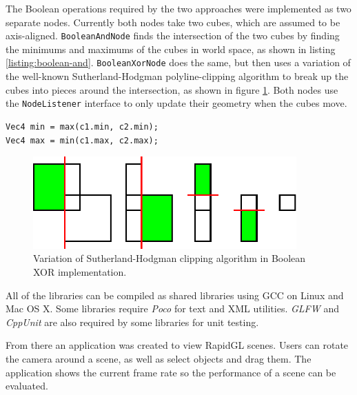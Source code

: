 \documentclass{report}
\begin{document}
The Boolean operations required by the two approaches were implemented as two
separate nodes.  Currently both nodes take two cubes, which are assumed to be
axis-aligned.  {\tt BooleanAndNode} finds the intersection of the two cubes by
finding the minimums and maximums of the cubes in world space, as shown in
listing \ref{listing:boolean-and}.  {\tt BooleanXorNode} does the same, but then
uses a variation of the well-known Sutherland-Hodgman polyline-clipping
algorithm to break up the cubes into pieces around the intersection, as shown in
figure \ref{clipping}.  Both nodes use the {\tt NodeListener} interface to only
update their geometry when the cubes move.

\lstset{language=C++}
\lstset{caption=Boolean AND implementation.}
\lstset{captionpos=b}
\lstset{label=listing:boolean-and}
\begin{lstlisting}[frame=single,float]
Vec4 min = max(c1.min, c2.min);
Vec4 max = min(c1.max, c2.max);
\end{lstlisting}

\begin{figure}
\centering
\includegraphics[width=0.9\textwidth]{clipping.pdf}
\caption{Variation of Sutherland-Hodgman clipping algorithm in Boolean XOR
implementation.}
\label{clipping}
\end{figure}

All of the libraries can be compiled as shared libraries using GCC on Linux and
Mac OS X.  Some libraries require {\em Poco} for text and XML utilities.  {\em
GLFW} and {\em CppUnit} are also required by some libraries for unit testing.

From there an application was created to view RapidGL scenes.  Users can
rotate the camera around a scene, as well as select objects and drag them.  The
application shows the current frame rate so the performance of a scene can be
evaluated.
\end{document}
